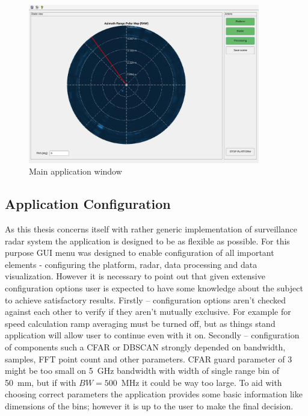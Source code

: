 \begin{figure}[h!]
  \centering
  \includegraphics[width=0.9\textwidth]{../img/vis_range_azimuth.jpg}
  \caption[Main application window]{Main application window}
  \label{fig:main_window}
\end{figure}

\subsection{Application Configuration}

As this thesis concerns itself with rather generic implementation of surveillance radar system the application is designed to be as flexible as possible.
For this purpose GUI menu was designed to enable configuration of all important elements - configuring the platform, radar, data processing and data visualization.
However it is necessary to point out that given extensive configuration options user is expected to have some knowledge about the subject to achieve satisfactory results.
Firstly -- configuration options aren't checked against each other to verify if they aren't mutually exclusive.
For example for speed calculation ramp averaging must be turned off, but as things stand application will allow user to continue even with it on.
Secondly -- configuration of components such a CFAR or DBSCAN strongly depended on bandwidth, samples, FFT point count and other parameters.
CFAR guard parameter of 3 might be too small on 5~GHz bandwidth with width of single range bin of 50~mm, but if with $BW=500$~MHz it could be way too large.
To aid with choosing correct parameters the application provides some basic information like dimensions of the bins; however it is up to the user to make the final decision.

